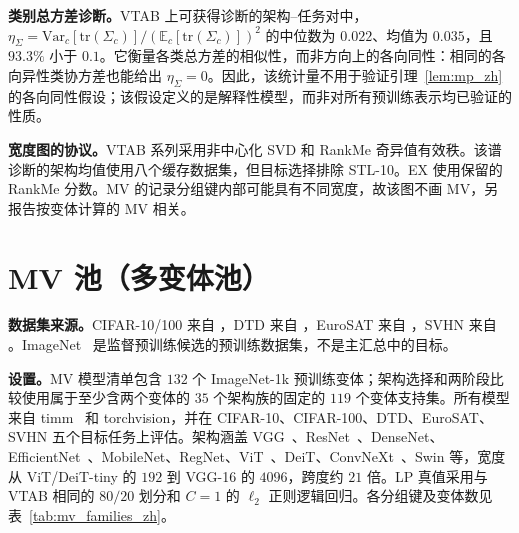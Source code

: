 \documentclass{article}
\begin{document}
\textbf{类别总方差诊断。}VTAB 上可获得诊断的架构--任务对中，$\eta_\Sigma=\mathrm{Var}_c[\mathrm{tr}(\Sigma_c)]/(\mathbb E_c[\mathrm{tr}(\Sigma_c)])^2$ 的中位数为 $0.022$、均值为 $0.035$，且 $93.3\%$ 小于 $0.1$。它衡量各类总方差的相似性，而非方向上的各向同性：相同的各向异性类协方差也能给出 $\eta_\Sigma=0$。因此，该统计量不用于验证引理~\ref{lem:mp_zh} 的各向同性假设；该假设定义的是解释性模型，而非对所有预训练表示均已验证的性质。

\textbf{宽度图的协议。}VTAB 系列采用非中心化 SVD 和 RankMe 奇异值有效秩。该谱诊断的架构均值使用八个缓存数据集，但目标选择排除 STL-10。EX 使用保留的 RankMe 分数。MV 的记录分组键内部可能具有不同宽度，故该图不画 MV，另报告按变体计算的 MV 相关。



\section{MV 池（多变体池）}
\textbf{数据集来源。}CIFAR-10/100 来自 \citet{krizhevsky2009cifar}，DTD 来自 \citet{cimpoi2014dtd}，EuroSAT 来自 \citet{helber2017eurosat}，SVHN 来自 \citet{netzer2011svhn}。ImageNet~\citep{deng2009imagenet} 是监督预训练候选的预训练数据集，不是主汇总中的目标。

\textbf{设置。}MV 模型清单包含 $132$ 个 ImageNet-1k 预训练变体；架构选择和两阶段比较使用属于至少含两个变体的 $35$ 个架构族的固定的 $119$ 个变体支持集。所有模型来自 timm~\citep{wightman2019timm} 和 torchvision，并在 CIFAR-10、CIFAR-100、DTD、EuroSAT、SVHN 五个目标任务上评估。架构涵盖 VGG~\citep{simonyan2015vgg}、ResNet~\citep{he2016resnet}、DenseNet、EfficientNet~\citep{tan2019efficientnet}、MobileNet、RegNet、ViT~\citep{dosovitskiy2021vit}、DeiT、ConvNeXt~\citep{liu2022convnext}、Swin 等，宽度从 ViT/DeiT-tiny 的 $192$ 到 VGG-16 的 $4096$，跨度约 $21$ 倍。LP 真值采用与 VTAB 相同的 $80/20$ 划分和 $C=1$ 的 $\ell_2$ 正则逻辑回归。各分组键及变体数见表~\ref{tab:mv_families_zh}。
\end{document}
